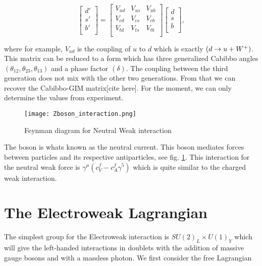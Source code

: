 \begin{equation}\label{CKM}
\begin{bmatrix}
d' \\
s' \\
b' \\
\end{bmatrix} =
\begin{bmatrix}
V_{ud} & V_{us} & V_{ub} \\
V_{cd} & V_{cs} & V_{cb} \\
V_{td} & V_{ts} & V_{tb} \\
\end{bmatrix}
\begin{bmatrix}
d \\
s \\
b \\
\end{bmatrix},
\end{equation}

where for example, $V_{ud}$ is the coupling of $u$ to $d$ which is exactly $(d\rightarrow u+W^+)$. This matrix can be reduced to a form which has three generalized Cabibbo angles $(\theta_{12},\theta_{23},\theta_{13})$ and a phase factor $(\delta)$. The coupling between the third generation does not mix with the other two generations. From that we can recover the Cabibbo-GIM matrix[cite here]. For the moment, we can only determine the values from experiment. 

\begin{figure}
 	\centering
	\texttt{[image: Zboson\_interaction.png]}
 	\caption{Feynman diagram for Neutral Weak interaction}
 	\label{ZbosonInteraction}
\end{figure}

The \Z boson is whats known as the neutral current. This boson mediates forces between particles and its respective antiparticles, see fig. \ref{ZbosonInteraction}. This interaction for the neutral weak force is $\gamma^\mu(c_V^f-c_A^f\gamma^5)$ which is quite similar to the charged weak interaction. 

\section{The Electroweak Lagrangian}

The simplest group for the Electroweak interaction is $SU(2)_L\times U(1)_Y$ which will give the left-handed interactions in doublets with the addition of massive gauge bosons \W and \Z with a massless photon. We first consider the free Lagrangian

